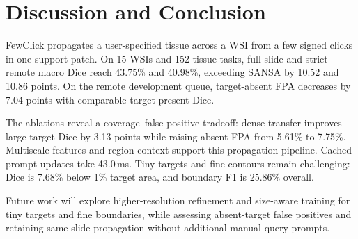 \section{Discussion and Conclusion}
FewClick propagates a user-specified tissue across a WSI from a few signed clicks in one support patch. On 15 WSIs and 152 tissue tasks, full-slide and strict-remote macro Dice reach 43.75\% and 40.98\%, exceeding SANSA by 10.52 and 10.86 points. On the remote development queue, target-absent FPA decreases by 7.04 points with comparable target-present Dice.

The ablations reveal a coverage--false-positive tradeoff: dense transfer improves large-target Dice by 3.13 points while raising absent FPA from 5.61\% to 7.75\%. Multiscale features and region context support this propagation pipeline. Cached prompt updates take 43.0\,ms. Tiny targets and fine contours remain challenging: Dice is 7.68\% below 1\% target area, and boundary F1 is 25.86\% overall.

Future work will explore higher-resolution refinement and size-aware training for tiny targets and fine boundaries, while assessing absent-target false positives and retaining same-slide propagation without additional manual query prompts.
